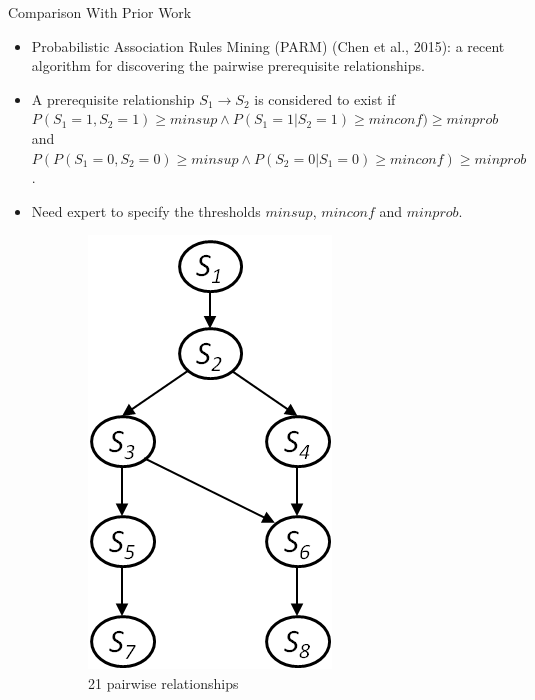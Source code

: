 \documentclass[hyperref={pdfpagelabels=false}]{beamer}
\begin{document}
\begin{frame}{Comparison With Prior Work}
	\begin{itemize}\small
		\item Probabilistic Association Rules Mining (PARM) (Chen et al., 2015): a recent algorithm for discovering the \alert{pairwise} prerequisite relationships.
		\item A prerequisite relationship $S_1\rightarrow S_2$ is considered to exist if
		$P(S_1=1,S_2=1) \ge minsup \wedge P(S_1=1|S_2=1)\ge minconf) \ge minprob$ and $P(P(S_1=0,S_2=0) \ge minsup \wedge P(S_2=0|S_1=0)\ge minconf) \ge minprob$. 
		\item Need expert to specify the thresholds $minsup$, $minconf$ and $minprob$.
	\end{itemize}
	\begin{figure}[!ht]\small
		\centering
		\begin{subfigure}[t]{0.49\linewidth}
			\centering
			\includegraphics[width=0.3\linewidth]{figures/model3.png}
			\caption{\footnotesize 21 pairwise relationships}
		\end{subfigure}
		\begin{subfigure}[t]{0.49\linewidth}
			\centering

\end{subfigure}
\end{figure}
\end{frame}
\end{document}
